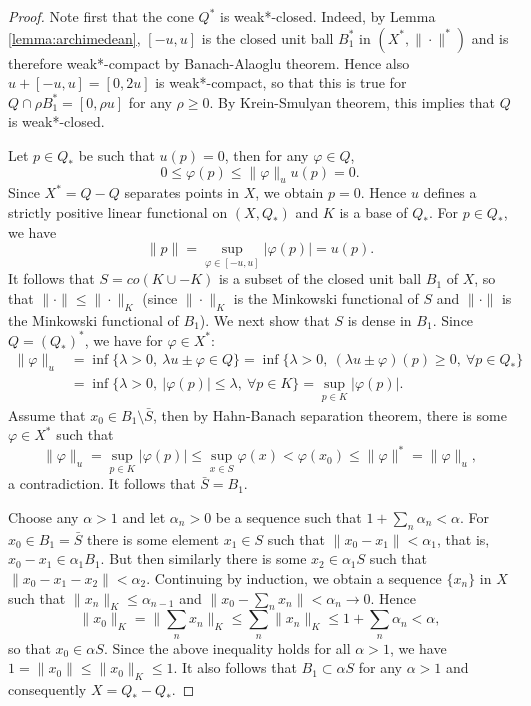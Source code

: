\documentclass[12pt]{article}
\theoremstyle{remark}
\newcommand{\<}{\langle}
\begin{document}
\begin{proof}
Note first that the cone $Q^*$ is weak*-closed. Indeed, by Lemma \ref{lemma:archimedean}, $[-u,u]$ is the closed unit ball $B^*_1$ in $(X^*,\|\cdot\|^*)$ and is therefore weak*-compact by Banach-Alaoglu theorem. Hence also $u+[-u,u]=[0,2u]$ is weak*-compact, so that 
this is true for $Q\cap \rho B_1^*= [0,\rho u]$ for any $\rho\ge 0$. By Krein-Smulyan theorem, this implies that $Q$ is weak*-closed.

Let $p\in Q_*$ be such that $u(p)=0$, then for any $\varphi\in Q$, 
\[
0\le \varphi(p)\le \|\varphi\|_uu(p)=0.
\]
Since  $X^*=Q-Q$ separates points in $X$, we obtain $p=0$. Hence 
$u$ defines a strictly positive linear functional on $(X,Q_*)$  and $K$ is a base of $Q_*$. 
For $p\in Q_*$, we have
\[
\|p\|=\sup_{\varphi\in [-u,u]}|\varphi(p)|=u(p).
\]
It follows that $S=co(K\cup -K)$ is a subset of the closed unit ball $B_1$ of $X$, so that $\|\cdot\|\le \|\cdot\|_K$ (since $\|\cdot\|_K$ is the Minkowski functional of $S$ and 
$\|\cdot\|$ is the Minkowski functional of $B_1$).   We next show that $S$ is dense in $B_1$. Since $Q=(Q_*)^*$, we have for $\varphi\in X^*$:
\begin{align*}
\|\varphi\|_u&=\inf\{\lambda >0,\ \lambda u\pm \varphi\in Q\}=\inf\{\lambda >0,\ (\lambda u\pm \varphi)(p)\ge 0,\ \forall p \in Q_*\}\\
&= \inf\{\lambda>0,\ |\varphi(p)|\le \lambda,\ \forall p\in K\}=\sup_{p\in K}|\varphi(p)|.
\end{align*}
Assume that $x_0\in B_1\setminus \bar S$, then by Hahn-Banach separation theorem, there is some $\varphi\in X^*$ such that 
\[
\|\varphi\|_u=\sup_{p\in K}|\varphi(p)|\le \sup_{x\in S}\varphi(x)< \varphi(x_0)\le \|\varphi\|^*=\|\varphi\|_u,
\]
a contradiction. It follows that $\bar S=B_1$.  

Choose any $\alpha>1$ and let $\alpha_n>0$ be a sequence such that  $1+\sum_n\alpha_n<\alpha$. For $x_0\in B_1=\bar S$ there is some element $x_1\in S$ such that $\|x_0-x_1\|< \alpha_1$, that is, $x_0-x_1\in \alpha_1B_1$. But then similarly there is some $x_2\in \alpha_1S$ 
such that $\|x_0-x_1-x_2\|<\alpha_2$. Continuing by induction, we obtain a sequence $\{x_n\}$ in $X$ such that $\|x_n\|_K\le \alpha_{n-1}$ and  $\|x_0-\sum_n x_n\|<\alpha_n\to 0$. Hence  
\[
\|x_0\|_K=\|\sum_n x_n\|_K\le \sum_n\|x_n\|_K\le 1+\sum_n\alpha_n<\alpha,
\]
so that  $x_0\in \alpha S$. Since the above inequality holds for all $\alpha>1$, we have
$1=\|x_0\|\le \|x_0\|_K\le 1$. It also  follows that  $B_1\subset \alpha S$ for any $\alpha>1$ and consequently $X=Q_*-Q_*$. 





\end{proof}
\end{document}
